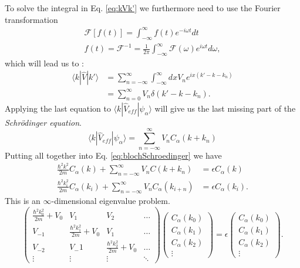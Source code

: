 		To solve the integral in Eq. \ref{eq:kVk'} we furthermore need to use the Fourier transformation 
		\begin{gather}
			\mathcal{F}[f(t)] = \int_{-\infty}^{\infty} f(t) e^{-i\omega t} dt \\
			f(t) = \mathcal{F}^{-1} = \frac{1}{2 \pi} \int_{-\infty}^\infty \mathcal{F}(\omega) e^{i\omega t} d\omega,
		\end{gather} 
		which will lead us to :
		\begin{equation}
			\begin{split}
				\langle k | \hat V | k' \rangle &= \sum_{n=-\infty}^{\infty} \int_{-\infty}^{\infty} dx V_n e^{ix(k' - k - k_n)} \\
				&= \sum_{n=0}^{\infty} V_n \delta(k' - k - k_n).
			\end{split}
		\end{equation}
		Applying the last equation to $\langle k | \hat V_{eff} | \psi_\alpha \rangle$ will give us the last missing part of the \textit{Schrödinger equation}. 
		\begin{equation}
			\langle k | \hat V_{eff} | \psi_\alpha \rangle = \sum_{n=-\infty}^{\infty} V_n  C_\alpha(k + k_n)
		\end{equation}
		Putting all together into Eq. \ref{eq:blochSchroedinger} we have
		\begin{equation}
			\begin{split}
				\frac{\hbar^2 k^2}{2m} C_\alpha(k) + \sum_{n=-\infty}^{\infty}V_n C(k +k_n) &= \epsilon C_\alpha(k) \\
				\frac{\hbar^2 k_i^2}{2m} C_\alpha(k_i) + \sum_{n=-\infty}^{\infty}V_n C_\alpha(k_{i+n}) &= \epsilon C_\alpha(k_i).
			\end{split}
		\end{equation}
		This is an $\infty$-dimensional eigenvalue problem. 
		\begin{equation}
			\label{eq:blochEigenvalue}				
			\begin{pmatrix}
				\frac{\hbar^2 k_0^2}{2 m} + V_0 & V_1 & V_2 & \dots \\
				V_{-1} & \frac{\hbar^2 k_1^2}{2 m} + V_0 & V_1 & \dots \\
				V_{-2} & V_-1 & \frac{\hbar^2 k_2^2}{2 m} + V_0  & \dots \\
				\vdots & \vdots & \vdots & \ddots	 	
			\end{pmatrix}
			\begin{pmatrix}
				C_\alpha(k_0) \\
				C_\alpha(k_1) \\
				C_\alpha(k_2) \\
				\vdots
			\end{pmatrix}
			= \epsilon
			\begin{pmatrix}
				C_\alpha(k_0) \\
				C_\alpha(k_1) \\
				C_\alpha(k_2) \\
				\vdots
			\end{pmatrix}.
		\end{equation}
